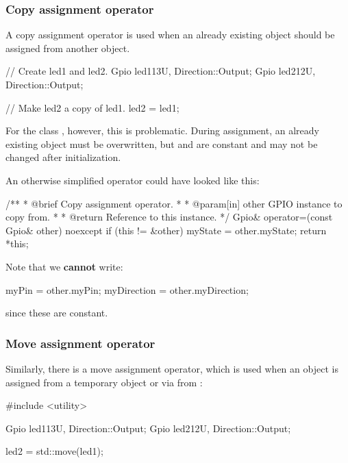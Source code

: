 \subsubsection{Copy assignment operator}
A copy assignment operator is used when an already existing object should be assigned from another
object.

\begin{cppcode}
// Create led1 and led2.
Gpio led1{13U, Direction::Output};
Gpio led2{12U, Direction::Output};

// Make led2 a copy of led1.
led2 = led1;
\end{cppcode}

\noindent For the class , however, this is problematic. During assignment, an already
existing object must be overwritten, but  and  are constant and may
not be changed after initialization.

An otherwise simplified operator could have looked like this:

\begin{cppcode}
/**
 * @brief Copy assignment operator.
 *
 * @param[in] other GPIO instance to copy from.
 *
 * @return Reference to this instance.
 */
Gpio& operator=(const Gpio& other) noexcept
{
    if (this != &other)
    {
        myState = other.myState;
    }
    return *this;
}
\end{cppcode}

\noindent Note that we \textbf{cannot} write:

\begin{cppcode}
myPin       = other.myPin;
myDirection = other.myDirection;
\end{cppcode}

\noindent since these are constant.

\subsubsection{Move assignment operator}
Similarly, there is a move assignment operator, which is used when an object is assigned from a
temporary object or via  from :

\begin{cppcode}
#include <utility>

Gpio led1{13U, Direction::Output};
Gpio led2{12U, Direction::Output};

led2 = std::move(led1);
\end{cppcode}

